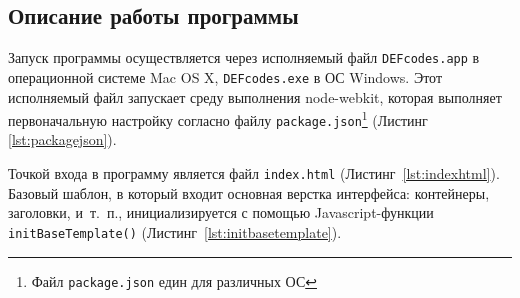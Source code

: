 \subsection{Описание работы программы}

Запуск программы осуществляется через исполняемый файл \texttt{DEFcodes.app} в операционной системе Mac OS X, \texttt{DEFcodes.exe} в ОС Windows. Этот исполняемый файл запускает среду выполнения node-webkit, которая выполняет первоначальную настройку согласно файлу \texttt{package.json}\footnote{Файл \texttt{package.json} един для различных ОС} (Листинг \ref{lst:packagejson}).


Точкой входа в программу является файл \texttt{index.html} (Листинг~\ref{lst:indexhtml}). Базовый шаблон, в который входит основная верстка интерфейса: контейнеры, заголовки, и~т.~п.,  инициализируется с помощью Javascript-функции \texttt{initBaseTemplate()} (Листинг~\ref{lst:initbasetemplate}).

